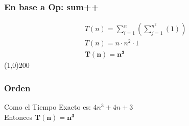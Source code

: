 \documentclass[letterpaper, fleqn]{report}
\begin{document}
\subsubsection*{En base a Op: sum++}
\begin{align*}
&T(n) = \sum_{i=1}^{n}\left(\sum_{j=1}^{n^2}(1)\right)\\
&T(n) = n \cdot n^2 \cdot 1\\
&\mathbf{T(n) = n^3}
\end{align*}
\line(1,0){200}
\subsubsection*{Orden}
Como el Tiempo Exacto es: $\displaystyle 4n^3 + 4n + 3$\\
Entonces $\mathbf{T(n) = n^3}$
\end{document}
